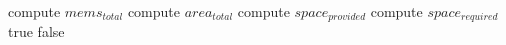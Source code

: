 \setlength{\textfloatsep}{0.2cm}
\begin{algorithm2e}[h]
		compute $mems_{total}$\;
		compute $area_{total}$\;
		compute $space_{provided}$\;
		compute $space_{required}$\;
		{
			\Return true\;
		}
		{
			\Return false\;
		}
	\caption{$ConstraintsCheck_{\alpha}()$}
	\label{algo:constrain_check_a}
\end{algorithm2e}
\setlength{\textfloatsep}{0.2cm}